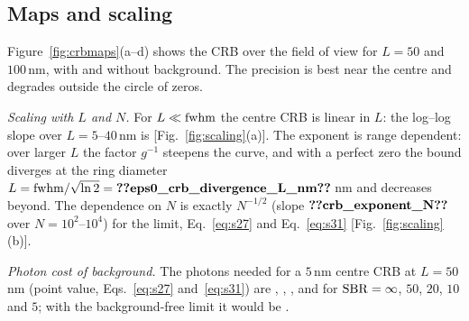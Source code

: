 \subsection{Maps and scaling}
Figure~\ref{fig:crbmaps}(a--d) shows the CRB over the field of view for $L=50$ and $100$\,nm,
with and without background. The precision is best near the centre and degrades outside the
circle of zeros.

\emph{Scaling with $L$ and $N$.} For $L\ll\mathrm{fwhm}$ the centre CRB is linear in $L$: the log--log
slope over $L=5$--$40$\,nm is 
[Fig.~\ref{fig:scaling}(a)]. The exponent is range dependent: over larger $L$ the factor
$g^{-1}$ steepens the curve, and with a perfect zero the bound diverges at the ring diameter
$L=\fwhm/\sqrt{\ln2}=\pnum{eps0_crb_divergence_L_nm}\src{eps0_crb_divergence_L_nm}$\,nm and
decreases beyond. The dependence on $N$ is exactly $N^{-1/2}$ (slope
$\pnum{crb_exponent_N}\src{crb_exponent_N}$ over $N=10^2$--$10^4$) for the limit, Eq.~\eqref{eq:s27} and Eq.~\eqref{eq:s31}
[Fig.~\ref{fig:scaling}(b)].

\emph{Photon cost of background.} The photons needed for a $5$\,nm centre CRB at $L=50$\,nm
(point value, Eqs.~\eqref{eq:s27} and~\eqref{eq:s31}) are
,
,
,
 and
 for $\mathrm{SBR}=\infty$, $50$, $20$,
$10$ and $5$; with the background-free limit it would be
.

